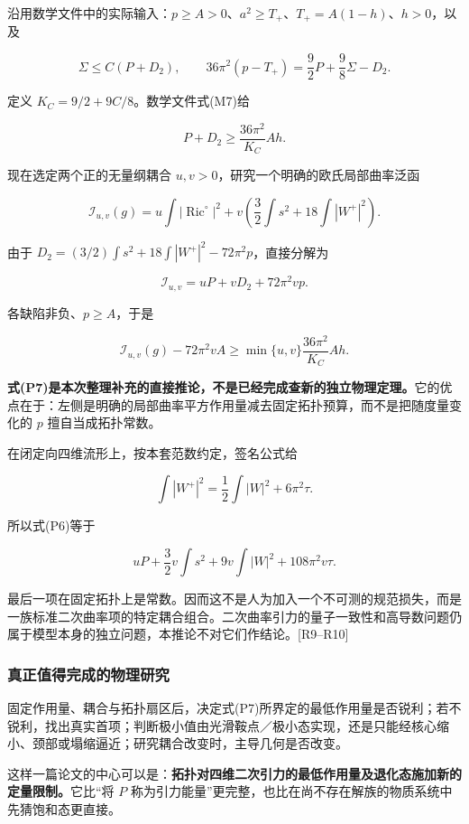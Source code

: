 \documentclass[UTF8,a4paper,11pt,fontset=fandol]{ctexart}
\begin{document}
沿用数学文件中的实际输入：\(p\ge A>0\)、\(a^2\ge T_+\)、\(T_+=A(1-h)\)、\(h>0\)，以及

\[
\Sigma\le C(P+D_2),\qquad
36\pi^2(p-T_+)=\frac92P+\frac98\Sigma-D_2.
\]

定义 \(K_C=9/2+9C/8\)。数学文件式(M7)给

\[
P+D_2\ge\frac{36\pi^2}{K_C}Ah.
\tag{P5}
\]

现在选定两个正的无量纲耦合 \(u,v>0\)，研究一个明确的欧氏局部曲率泛函

\[
\mathscr I_{u,v}(g)=
 u\int|\operatorname{Ric}^{\circ}|^2
 +v\left(\frac32\int s^2+18\int|W^+|^2\right).
\tag{P6}
\]

由于 \(D_2=(3/2)\int s^2+18\int|W^+|^2-72\pi^2p\)，直接分解为

\[
\mathscr I_{u,v}=uP+vD_2+72\pi^2vp.
\]

各缺陷非负、\(p\ge A\)，于是

\[
\boxed{
\mathscr I_{u,v}(g)-72\pi^2vA
\ge\min\{u,v\}\frac{36\pi^2}{K_C}Ah.
}
\tag{P7}
\]

\textbf{式(P7)是本次整理补充的直接推论，不是已经完成查新的独立物理定理。}它的优点在于：左侧是明确的局部曲率平方作用量减去固定拓扑预算，而不是把随度量变化的
\(p\) 擅自当成拓扑常数。

在闭定向四维流形上，按本套范数约定，签名公式给

\[
\int|W^+|^2=\frac12\int|W|^2+6\pi^2\tau.
\]

所以式(P6)等于

\[
uP+\frac32v\int s^2+9v\int|W|^2+108\pi^2v\tau.
\tag{P8}
\]

最后一项在固定拓扑上是常数。因而这不是人为加入一个不可测的规范损失，而是一族标准二次曲率项的特定耦合组合。二次曲率引力的量子一致性和高导数问题仍属于模型本身的独立问题，本推论不对它们作结论。{[}R9--R10{]}

\subsubsection{真正值得完成的物理研究}\label{ux771fux6b63ux503cux5f97ux5b8cux6210ux7684ux7269ux7406ux7814ux7a76}

固定作用量、耦合与拓扑扇区后，决定式(P7)所界定的最低作用量是否锐利；若不锐利，找出真实首项；判断极小值由光滑鞍点／极小态实现，还是只能经核心缩小、颈部或塌缩逼近；研究耦合改变时，主导几何是否改变。

这样一篇论文的中心可以是：\textbf{拓扑对四维二次引力的最低作用量及退化态施加新的定量限制。}它比``将
\(P\)
称为引力能量''更完整，也比在尚不存在解族的物质系统中先猜饱和态更直接。
\end{document}
